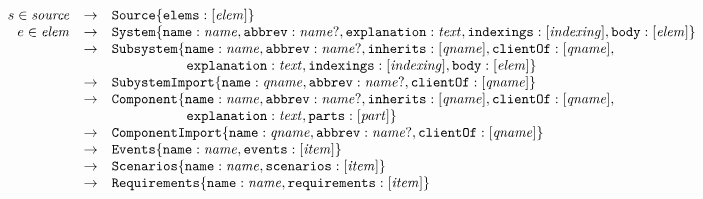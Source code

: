 \documentclass{article}
\begin{document}
\[
\begin{array}{rcll}
  s \in \nt{source} & \rightarrow &\lab{Source}\{\lab{elems}:\listof{\nt{elem}}\} \\
  e \in \nt{elem} & \rightarrow & \lab{System}\{\lab{name}:\nt{name},\lab{abbrev}:\optof{\nt{name}},
                                                \lab{explanation}:\nt{text},\lab{indexings}:\listof{\nt{indexing}},
                                                \lab{body}:\listof{\nt{elem}}\} \\
                  & \rightarrow & \lab{Subsystem}\{\lab{name}:\nt{name},\lab{abbrev}:\optof{\nt{name}},
                                                \lab{inherits}:\listof{\nt{qname}},\lab{clientOf}:\listof{\nt{qname}}, \\
                  &             & \ \ \ \ \ \ \ \ \ \ \ \ \ \ \ \                                                 
                                                \lab{explanation}:\nt{text},\lab{indexings}:\listof{\nt{indexing}},
                                                \lab{body}:\listof{\nt{elem}}\} \\
                  & \rightarrow & \lab{SubystemImport}\{\lab{name}:\nt{qname},\lab{abbrev}:\optof{\nt{name}},
                                                        \lab{clientOf}:\listof{\nt{qname}}\} \\
                  & \rightarrow &\lab{Component}\{\lab{name}:\nt{name},\lab{abbrev}:\optof{\nt{name}},
                                                \lab{inherits}:\listof{\nt{qname}},\lab{clientOf}:\listof{\nt{qname}},\\
                  &             & \ \ \ \ \ \ \ \ \ \ \ \ \ \ \ \                                                 
                                                \lab{explanation}:\nt{text},\lab{parts}:\listof{\nt{part}}\} \\
                  & \rightarrow & \lab{ComponentImport}\{\lab{name}:\nt{qname},\lab{abbrev}:\optof{\nt{name}},
                                                         \lab{clientOf}:\listof{\nt{qname}}\} \\
                  & \rightarrow & \lab{Events}\{\lab{name}:\nt{name},\lab{events}:\listof{\nt{item}}\} \\
                  & \rightarrow & \lab{Scenarios}\{\lab{name}:\nt{name},\lab{scenarios}:\listof{\nt{item}}\} \\
                  & \rightarrow & \lab{Requirements}\{\lab{name}:\nt{name},\lab{requirements}:\listof{\nt{item}}\} \\

\end{array}\]
\end{document}

